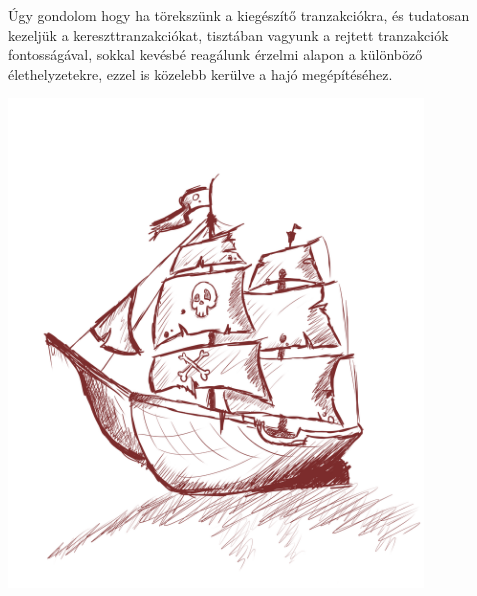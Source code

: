 \documentclass[a4paper,12pt]{article}
\begin{document}
	Úgy gondolom hogy ha törekszünk a kiegészítő tranzakciókra, és tudatosan kezeljük a kereszttranzakciókat, tisztában vagyunk a rejtett tranzakciók fontosságával, sokkal kevésbé reagálunk érzelmi alapon a különböző élethelyzetekre, ezzel is közelebb kerülve a hajó megépítéséhez.
	
		\begin{center}
		\includegraphics[width=11cm]{svgs/ship.png} \\[0.5cm]
	\end{center}
	
\end{document}

